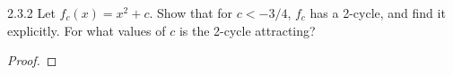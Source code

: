 \begin{problem}{2.3.2}
  Let $f_c(x) = x^2 + c$. Show that for $c < -3/4$, $f_c$ has a 2-cycle, and
  find it explicitly. For what values of $c$ is the 2-cycle attracting?
\end{problem}

\begin{proof}
\end{proof}
\newpage
